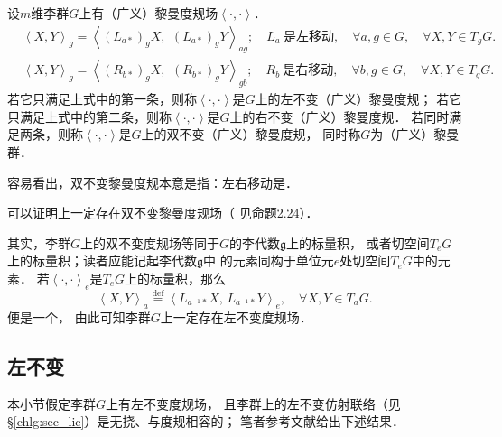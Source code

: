 \begin{definition}
    设$m$维李群$G$上有（广义）黎曼度规场$\left<\cdot,\cdot \right>$．
    \begin{align*}
        &\left<X,Y\right>_{g} = \left<(L_{a*})_g X,\,\ (L_{a*})_g Y \right>_{ag};
        \quad L_{a} \  \text{是左移动},\quad \forall a,g\in G, \quad \forall X,Y \in T_g G. \\
        &\left<X,Y\right>_{g} = \left<(R_{b*})_g X,\,\ (R_{b*})_g Y \right>_{gb};
        \quad R_{b} \  \text{是右移动} ,\quad \forall b,g\in G, \quad \forall X,Y \in T_g G. 
    \end{align*}
    若它只满足上式中的第一条，则称$\left<\cdot,\cdot \right>$是$G$上的{\heiti 左不变（广义）黎曼度规}；
    若它只满足上式中的第二条，则称$\left<\cdot,\cdot \right>$是$G$上的{\heiti 右不变（广义）黎曼度规}．
    若同时满足两条，则称$\left<\cdot,\cdot \right>$是$G$上的{\heiti 双不变（广义）黎曼度规}，
    同时称$G$为{\heiti （广义）黎曼群}．
\end{definition}
容易看出，双不变黎曼度规本意是指：左右移动是．


可以证明上一定存在双不变黎曼度规场（ 见\parencite[\S 2.2]{Alexandrino-2015}命题2.24）．

其实，李群$G$上的双不变度规场等同于$G$的李代数$\mathfrak{g}$上的标量积，
或者切空间$T_e G$上的标量积；读者应能记起李代数$\mathfrak{g}$中
的元素同构于单位元$e$处切空间$T_e G$中的元素．
若$\left<\cdot,\cdot \right>_e$是$T_e G$上的标量积，那么
\begin{equation}\label{chlg:eqn_left-invariant-metric}
    \left<X,Y\right>_a \overset{\mathrm {def}}{=} 
    \left<L_{a^{-1}*} X,\, L_{a^{-1}*} Y \right>_e, 
    \quad \forall X,Y \in T_a G.
\end{equation}
便是一个，
由此可知李群$G$上一定存在左不变度规场．

\subsection{左不变}
本小节假定李群$G$上有左不变度规场，
且李群上的左不变仿射联络（见\S\ref{chlg:sec_lic}）是无挠、与度规相容的；
笔者参考文献\parencite{Milnor-1976}给出下述结果．






